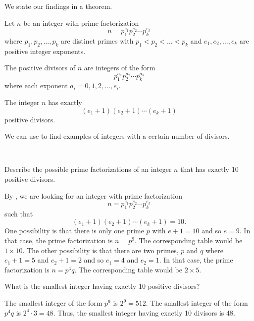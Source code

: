 We state our findings in a theorem.

\begin{thm}
\label{thm_list_count_div_from_prime_fact}
    Let $n$ be an integer with prime factorization
        $$n = p_1^{e_1} p_2^{e_2} \cdots p_k^{e_k}$$
    where $p_1, p_2, \ldots, p_k$ are distinct primes with $p_1 < p_2 < \ldots < p_k$ and $e_1, e_2, \ldots, e_k$ are positive integer exponents. 
        \begin{apart}
            \item The positive divisors of $n$ are integers of the form
                $$p_1^{a_1} p_2^{a_2} \cdots p_k^{a_k}$$
            where each exponent $a_i=0,1,2, \ldots, e_i$.
            \item The integer $n$ has exactly 
                $$(e_1+1)(e_2+1) \cdots (e_k+1)$$
            positive divisors.
        \end{apart}
\end{thm}

We can use  to find examples of integers with a certain number of divisors.

\begin{exam}
\label{exam_int_10div}
~
    \begin{apart}
        \item Describe the possible prime factorizations of an integer $n$ that has exactly 10 positive divisors.
            \begin{soln}
                By , we are looking for an integer with prime factorization     $$n = p_1^{e_1} 
                    p_2^{e_2} \cdots p_k^{e_k}$$ 
                such that 
                    $$(e_1+1)(e_2+1) \cdots (e_k+1)=10.$$
                One possibility is that there is only one prime $p$ with $e+1=10$ and so $e=9$.  In that case, the prime factorization is $n = p^9$. The corresponding table would be $1 \times 10$. The other possibility is that there are two primes, $p$ and $q$ where $e_1+1=5$ and $e_2+1=2$ and so $e_1=4$ and $e_2=1$.  In that case, the prime factorization is $n=p^4q$. The corresponding table would be $2 \times 5$. 
            \end{soln}
        \item What is the smallest integer having exactly 10 positive divisors?
            \begin{soln}
                The smallest integer of the form $p^9$ is $2^9=512$.  The smallest integer of the form $p^4q$ is $2^4\cdot 3 = 48$.  Thus, the smallest integer having exactly 10 divisors is 48.
            \end{soln}
    \end{apart}
\end{exam}

